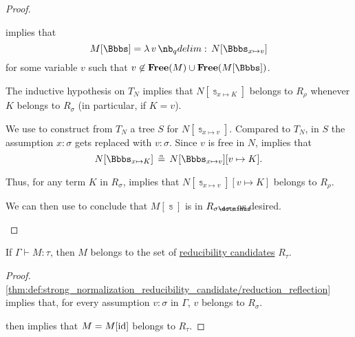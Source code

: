 \begin{proof}
\begin{itemize}
     implies that
    \begin{equation*}
      M[\Bbbs] = \qabs v N[\Bbbs_{x \mapsto v}]
    \end{equation*}
    for some variable \( v \) such that \( v \not\in \op*{Free}(M) \cup \op*{Free}(M[\Bbbs]) \).

    The inductive hypothesis on \( T_N \) implies that \( N[\Bbbs_{x \mapsto K}] \) belongs to \( R_\rho \) whenever \( K \) belongs to \( R_\sigma \) (in particular, if \( K = v \)).

    We use  to construct from \( T_N \) a tree \( S \) for \( N[\Bbbs_{x \mapsto v}] \). Compared to \( T_N \), in \( S \) the assumption \( x: \sigma \) gets replaced with \( v: \sigma \). Since \( v \) is free in \( N \),  implies that
    \begin{equation*}
      N[\Bbbs_{x \mapsto K}] \aequiv N[\Bbbs_{x \mapsto v}][v \mapsto K].
    \end{equation*}

    Thus, for any term \( K \) in \( R_\sigma \),  implies that \( N[\Bbbs_{x \mapsto v}][v \mapsto K] \) belongs to \( R_\rho \).

    We can then use  to conclude that \( M[\Bbbs] \) is in \( R_{\sigma \synimplies \tau} \), as desired.
  \end{itemize}
\end{proof}

\begin{proposition}\label{thm:reducibility_candidate_adequacy}
  If \( \Gamma \vdash M: \tau \), then \( M \) belongs to the set of \hyperref[thm:def:strong_normalization_reducibility_candidate]{reducibility candidates} \( R_\tau \).
\end{proposition}
\begin{proof}
  \ref{thm:def:strong_normalization_reducibility_candidate/reduction_reflection} implies that, for every assumption \( v: \sigma \) in \( \Gamma \), \( v \) belongs to \( R_\sigma \).

   then implies that \( M = M[\operatorname{id}] \) belongs to \( R_\tau \).
\end{proof}

